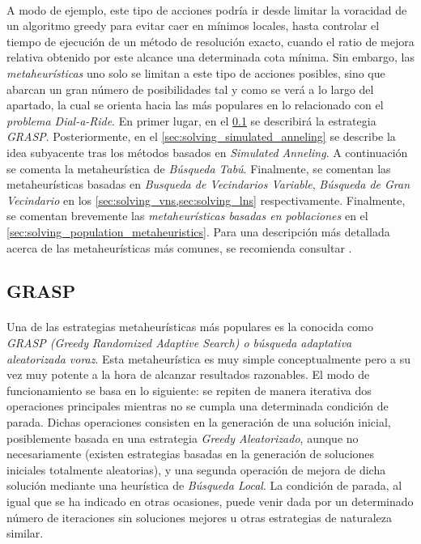 \documentclass{subfiles}
\begin{document}
      \paragraph{}
      A modo de ejemplo, este tipo de acciones podría ir desde limitar la voracidad de un algoritmo greedy para evitar caer en mínimos locales, hasta controlar el tiempo de ejecución de un método de resolución exacto, cuando el ratio de mejora relativa obtenido por este alcance una determinada cota mínima. Sin embargo, las \emph{metaheurísticas} uno solo se limitan a este tipo de acciones posibles, sino que abarcan un gran número de posibilidades tal y como se verá a lo largo del apartado, la cual se orienta hacia las más populares en lo relacionado con el \emph{problema Dial-a-Ride}. En primer lugar, en el \cref{sec:solving_grasp} se describirá la estrategia \emph{GRASP}. Posteriormente, en el \cref{sec:solving_simulated_anneling} se describe la idea subyacente tras los métodos basados en \emph{Simulated Anneling}. A continuación se comenta la metaheurística de \emph{Búsqueda Tabú}. Finalmente, se comentan las metaheurísticas basadas en \emph{Busqueda de Vecindarios Variable}, \emph{Búsqueda de Gran Vecindario} en los \cref{sec:solving_vns,sec:solving_lns} respectivamente. Finalmente, se comentan brevemente las \emph{metaheurísticas basadas en poblaciones} en el \cref{sec:solving_population_metaheuristics}. Para una descripción más detallada acerca de las metaheurísticas más comunes, se recomienda consultar \cite{blum2003metaheuristics,glover2006handbook,boussaid2013survey,ho2018survey}.

      \subsection{GRASP}
      \label{sec:solving_grasp}

        \paragraph{}
        Una de las estrategias metaheurísticas más populares es la conocida como \emph{GRASP (Greedy Randomized Adaptive Search) o búsqueda adaptativa aleatorizada voraz}. Esta metaheurística es muy simple conceptualmente pero a su vez muy potente a la hora de alcanzar resultados razonables. El modo de funcionamiento se basa en lo siguiente: se repiten de manera iterativa dos operaciones principales mientras no se cumpla una determinada condición de parada. Dichas operaciones consisten en la generación de una solución inicial, posiblemente basada en una estrategia \emph{Greedy Aleatorizado}, aunque no necesariamente (existen estrategias basadas en la generación de soluciones iniciales totalmente aleatorias), y una segunda operación de mejora de dicha solución mediante una heurística de \emph{Búsqueda Local}. La condición de parada, al igual que se ha indicado en otras ocasiones, puede venir dada por un determinado número de iteraciones sin soluciones mejores u otras estrategias de naturaleza similar.
\end{document}
